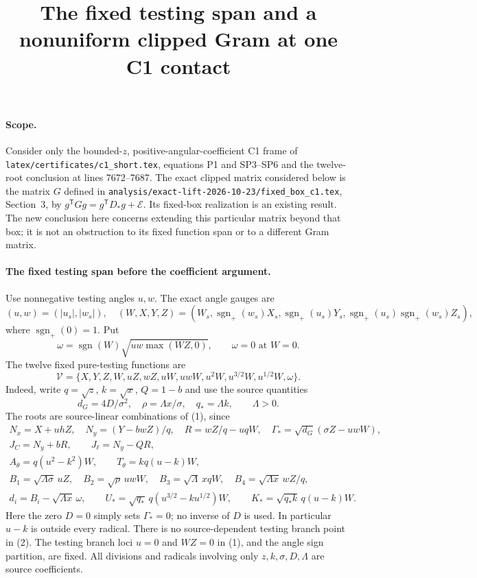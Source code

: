 \documentclass[11pt]{article}
\title{The fixed testing span and a nonuniform clipped Gram at one C1 contact}
\author{}\date{}
\newcommand{\sgn}{\operatorname{sgn}}
\begin{document}
\maketitle

\paragraph{Scope.}
Consider only the bounded-$z$, positive-angular-coefficient C1 frame of
\texttt{latex/certificates/c1\_short.tex}, equations P1 and SP3--SP6
and the twelve-root conclusion at lines 7672--7687.
The exact clipped matrix considered below is the matrix $G$ defined in
\texttt{analysis/exact-lift-2026-10-23/fixed\_box\_c1.tex},
Section~3, by $g^{\mathsf T}Gg=g^{\mathsf T}D_*g+\mathcal E$.
Its fixed-box realization is an existing result. The new conclusion here
concerns extending this particular matrix beyond that box; it is not an
obstruction to its fixed function span or to a different Gram matrix.

\paragraph{The fixed testing span before the coefficient argument.}
Use nonnegative testing angles $u,w$. The exact angle gauges are
\[
 (u,w)=(|u_s|,|w_s|),\quad
 (W,X,Y,Z)=(W_s,\sgn_+(w_s)X_s,\sgn_+(u_s)Y_s,
             \sgn_+(u_s)\sgn_+(w_s)Z_s),
\]
where $\sgn_+(0)=1$. Put
\[
 \omega=\sgn(W)\sqrt{uw\max(WZ,0)},\qquad \omega=0\text{ at }W=0.
\]
The twelve fixed pure-testing functions are
\[
 \mathcal V=\{X,Y,Z,W,uZ,wZ,uW,uwW,u^2W,u^{3/2}W,u^{1/2}W,\omega\}.
 \tag{1}
\]
Indeed, write $q=\sqrt z$, $k=\sqrt x$, $Q=1-b$ and use the
source quantities
\[
 d_G=4D/\sigma^2,\quad \rho=\Lambda x/\sigma,\quad q_*=\Lambda k,
 \qquad \Lambda>0.
\]
The roots are source-linear combinations of (1), since
\[
\begin{gathered}
 N_x=X+uhZ,\quad N_y=(Y-bwZ)/q,\quad
 R=wZ/q-uqW,\quad \Gamma_*=\sqrt{d_G}(\sigma Z-uwW),\\
 J_C=N_y+bR,\qquad J_\ell=N_y-QR,\\
 A_\theta=q(u^2-k^2)W,\qquad T_\theta=kq(u-k)W,\\
 B_1=\sqrt{\Lambda\sigma}\,uZ,\quad
 B_2=\sqrt\rho\,uwW,\quad B_3=\sqrt\Lambda\,xqW,\quad
 B_4=\sqrt{\Lambda x}\,wZ/q,\\
 d_i=B_i-\sqrt{\Lambda x}\,\omega,\qquad
 U_*=\sqrt{q_*}\,q(u^{3/2}-ku^{1/2})W,\qquad
 K_*=\sqrt{q_*k}\,q(u-k)W.
\end{gathered} \tag{2}
\]
Here the zero $D=0$ simply sets $\Gamma_*=0$; no inverse of $D$ is used.
In particular $u-k$ is outside every radical. There is no
source-dependent testing branch point in (2). The testing branch loci
$u=0$ and $WZ=0$ in (1), and the angle sign partition, are fixed.
All divisions and radicals involving only $z,k,\sigma,D,\Lambda$
are source coefficients.
\end{document}
